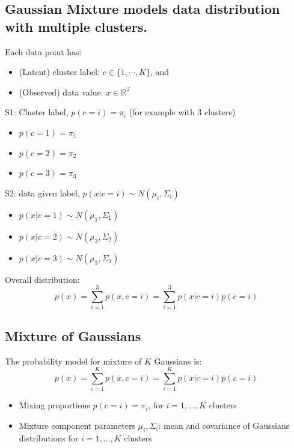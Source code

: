 \documentclass[10pt]{article}
\begin{document}
\subsection*{Gaussian Mixture models data distribution with multiple clusters.}
Each data point has:
\begin{itemize}
	\item (Latent) cluster label: $c \in \{1, \cdots, K\}$, and
	\item (Observed) data value: $x \in \mathbb{R}^J$
\end{itemize}
S1: Cluster label, $p(c = i) = \pi_i$ (for example with 3 clusters)
\begin{itemize}
	\item $p(c = 1) = \pi_1$
	\item $p(c = 2) = \pi_2$
	\item $p(c = 3) = \pi_3$
\end{itemize}
S2: data given label, $p(x | c = i) \sim N(\mu_i, \Sigma_i)$
\begin{itemize}
	\item $p(x | c = 1) \sim N(\mu_1, \Sigma_1)$
	\item $p(x | c = 2) \sim N(\mu_2, \Sigma_2)$
	\item $p(x | c = 3) \sim N(\mu_3, \Sigma_3)$
\end{itemize}
Overall distribution:
\[p(x) = \sum_{i = 1}^3 p(x, c = i) = \sum_{i = 1}^3 p(x | c = i) p(c = i)\]

\subsection*{Mixture of Gaussians}
The probability model for mixture of $K$ Gaussians is:
\[p(x) = \sum_{i = 1}^K p(x, c = i) = \sum_{i = 1}^K p(x | c = i) p(c = i)\]
\begin{itemize}
	\item Mixing proportions $p(c = i) = \pi_i$, for $i = 1, \dots, K$ clusters
	\item Mixture component parameters $\mu_i, \Sigma_i$: mean and covariance of Gaussians distributions for $i = 1, \dots, K$ clusters
\end{itemize}
\end{document}
